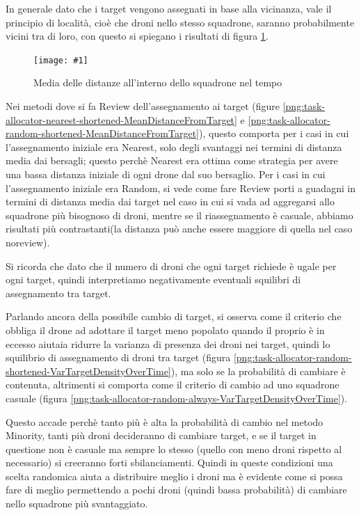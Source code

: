 \documentclass[a4paper,11pt,oneside, table]{article}
\newcommand{\putimage}[4] {
	\begin{figure}[H]
	    \centering
	    \texttt{[image: \#1]}
	    \caption{#2}\label{#3}
	\end{figure}
}
\begin{document}
In generale dato che i target vengono assegnati in base alla vicinanza, vale il principio di localit\`a, cio\`e che droni nello stesso squadrone, saranno probabilmente vicini tra di loro, con questo si spiegano i risultati di figura \ref{png:task-allocator-no-review-MeanDistancesWithinSquadron}.

\putimage{images/experiments/task-allocator-no-review/MeanDistancesWithinSquadron.png}{Media delle distanze all'interno dello squadrone nel tempo}{png:task-allocator-no-review-MeanDistancesWithinSquadron}{0.99}

Nei metodi dove si fa Review dell'assegnamento ai target (figure \ref{png:task-allocator-nearest-shortened-MeanDistanceFromTarget} e \ref{png:task-allocator-random-shortened-MeanDistanceFromTarget}), questo comporta per i casi in cui l'assegnamento iniziale era Nearest, solo degli svantaggi nei termini di distanza media dai bersagli; questo perchè Nearest era ottima come strategia per avere una bassa distanza iniziale di ogni drone dal suo bersaglio.
Per i casi in cui l'assegnamento iniziale era Random, si vede come fare Review porti a guadagni in termini di distanza media dai target nel caso in cui si vada ad aggregarsi allo squadrone più bisognoso di droni, mentre se il riassegnamento è casuale, abbiamo risultati più contrastanti(la distanza può anche essere maggiore di quella nel caso noreview).

Si ricorda che dato che il numero di droni che ogni target richiede  \`e ugale per ogni target, quindi interpretiamo negativamente eventuali squilibri di assegnamento tra target.

Parlando ancora della possibile cambio di target, si osserva come il criterio che obbliga il drone ad adottare il target meno popolato quando il proprio \`e in eccesso aiutaia ridurre la varianza di presenza dei droni nei target, quindi lo squilibrio di assegnamento di droni tra target (figura \ref{png:task-allocator-random-shortened-VarTargetDensityOverTime}), ma solo se la probabilit\`a di cambiare \`e contenuta, altrimenti si comporta come il criterio di cambio ad uno squadrone casuale (figura \ref{png:task-allocator-random-always-VarTargetDensityOverTime}).

Questo accade perch\`e tanto pi\`u \`e alta la probabilit\`a di cambio nel metodo Minority, tanti pi\`u droni decideranno di cambiare target, e se il target in questione non \`e casuale ma sempre lo stesso (quello con meno droni rispetto al necessario) si creeranno forti sbilanciamenti. 
Quindi in queste condizioni una scelta randomica aiuta a distribuire meglio i droni ma \`e evidente come si possa fare di meglio permettendo a pochi droni (quindi bassa probabilit\`a) di cambiare nello squadrone pi\`u svantaggiato.
\end{document}
